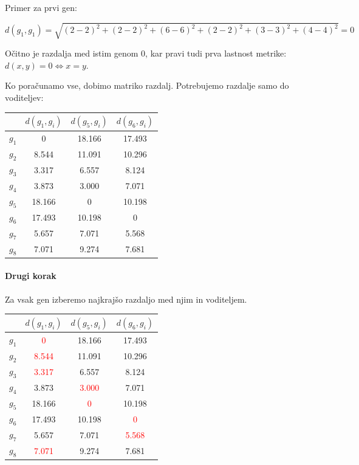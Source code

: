 \documentclass{article}
\begin{document}
\begin{enumerate}
		Primer za prvi gen:

		$$
		d(g_1, g_1) = \sqrt{ (2-2)^2 + (2-2)^2 + (6-6)^2 + (2-2)^2 + (3-3)^2 + (4-4)^2 } = 0
		$$

		Očitno je razdalja med istim genom 0, kar pravi tudi prva lastnost metrike: $d(x,y) = 0 \iff x = y$.

		Ko poračunamo vse, dobimo matriko razdalj. Potrebujemo razdalje samo do voditeljev:

		\begin{center}
			\begin{tabular}{c||c|c|c|}
				& $d(g_1, g_i)$ & $d(g_5, g_i)$ & $d(g_6, g_i)$ \\
				\hline
				\hline
				$g_1$ & 0 & 18.166 & 17.493\\
				\hline
				$g_2$ & 8.544 & 11.091 & 10.296\\
				\hline
				$g_3$ & 3.317 & 6.557 & 8.124\\
				\hline
				$g_4$ & 3.873 & 3.000 & 7.071\\
				\hline
				$g_5$ & 18.166 & 0 & 10.198\\
				\hline
				$g_6$ & 17.493 & 10.198 & 0\\
				\hline
				$g_7$ & 5.657 & 7.071 & 5.568\\
				\hline
				$g_8$ & 7.071 & 9.274 & 7.681\\
			\end{tabular}
		\end{center}

		\paragraph{Drugi korak} Za vsak gen izberemo najkrajšo razdaljo med njim in voditeljem.

		\begin{center}
			\begin{tabular}{c||c|c|c|}
				& $d(g_1, g_i)$ & $d(g_5, g_i)$ & $d(g_6, g_i)$ \\
				\hline
				\hline
				$g_1$ & \textcolor{red}{0} & 18.166 & 17.493\\
				\hline
				$g_2$ & \textcolor{red}{8.544} & 11.091 & 10.296\\
				\hline
				$g_3$ & \textcolor{red}{3.317} & 6.557 & 8.124\\
				\hline
				$g_4$ & 3.873 & \textcolor{red}{3.000} & 7.071\\
				\hline
				$g_5$ & 18.166 & \textcolor{red}{0} & 10.198\\
				\hline
				$g_6$ & 17.493 & 10.198 & \textcolor{red}{0}\\
				\hline
				$g_7$ & 5.657 & 7.071 & \textcolor{red}{5.568}\\
				\hline
				$g_8$ & \textcolor{red}{7.071} & 9.274 & 7.681\\
			\end{tabular}
		\end{center}


\end{enumerate}
\end{document}
